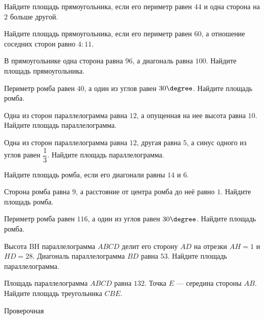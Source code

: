 \begin{class}[number=4]
\begin{listofex}
		\item Найдите площадь прямоугольника, если его периметр равен \( 44 \) и одна сторона на \( 2 \) больше другой.
		\item Найдите площадь прямоугольника, если его периметр равен \( 60 \), а отношение соседних сторон равно \( 4:11 \).
		\item В прямоугольнике одна сторона равна \( 96 \), а диагональ равна \( 100 \). Найдите площадь прямоугольника.
		\item Периметр ромба равен \( 40 \), а один из углов равен \( 30\degree \). Найдите площадь ромба.
		\item Одна из сторон параллелограмма равна \( 12 \), а опущенная на нее высота равна \( 10 \). Найдите площадь параллелограмма.
		\item Одна из сторон параллелограмма равна \( 12 \), другая равна \( 5 \), а синус одного из углов равен \( \dfrac{1}{3} \).  Найдите площадь параллелограмма.
		\item Найдите площадь ромба, если его диагонали равны \( 14 \) и \( 6 \).
		\item Сторона ромба равна \( 9 \), а расстояние от центра ромба до неё равно \( 1 \). Найдите площадь ромба.
		\item Периметр ромба равен \( 116 \), а один из углов равен \( 30\degree \). Найдите площадь ромба.
		\item Высота BH параллелограмма \( ABCD \) делит его сторону \( AD \) на отрезки \( AH=1 \) и \( HD=28 \). Диагональ параллелограмма \( BD \) равна \( 53 \). Найдите площадь параллелограмма.
		\item Площадь параллелограмма \( ABCD \) равна \( 132 \). Точка \( E \) --- середина стороны \( AB \). Найдите площадь треугольника \( CBE \).
	\end{listofex}
\end{class}


\begin{exam}
	\begin{listofex}
		\item Проверочная
	\end{listofex}
\end{exam}
